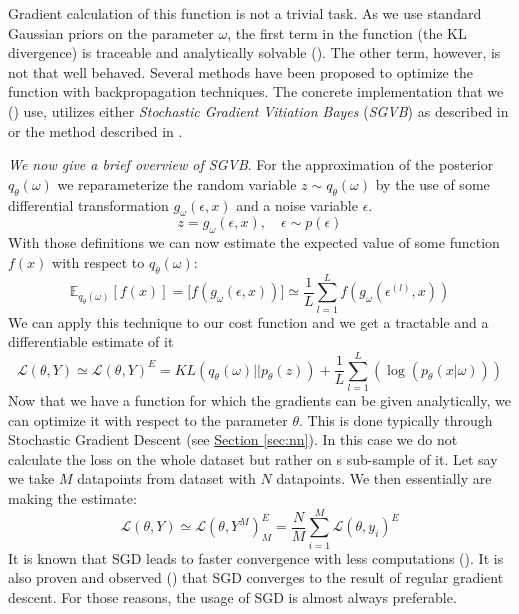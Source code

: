 \documentclass[12pt,a4paper,twoside]{scrartcl}
\numberwithin{equation}{section}
\newcommand{\refsec}[1]{\hyperref[#1]{Section \ref*{#1}}}
\begin{document}
Gradient calculation of this function is not a trivial task. As we use standard Gaussian priors on the parameter \(\omega\), the first term in the function (the KL divergence) is traceable and analytically solvable (\cite{paisley2012}). The other term, however, is not that well behaved. Several methods have been proposed to optimize the function with backpropagation techniques. The concrete implementation that we (\cite{edward}) use, utilizes either \emph{Stochastic Gradient Vitiation Bayes} (\emph{SGVB}) as described in \cite{kingma2013} or the method described in \cite{paisley2012}. 

\emph{We now give a brief overview of SGVB}. For the approximation of the posterior \(q_{\theta}(\omega)\) we reparameterize the random variable \(z \sim q_{\theta}(\omega)\) by the use of some differential transformation \(g_{\omega}(\epsilon , x)\) and a noise variable \(\epsilon\).
\begin{equation}
  z =  g_{\omega}(\epsilon , x), \quad \epsilon \sim p(\epsilon)
\end{equation}
With those definitions we can now estimate the expected value of some function \(f(x)\) with respect to \(q_{\theta}(\omega)\):
\begin{equation}
  \mathbb{E}_{q_{\theta}(\omega)}[f(x)] = \mathbb[f(g_{\omega}(\epsilon , x))] \simeq \frac{1}{L}\sum_{l=1}^L f(g_{\omega}(\epsilon^{(l)} , x))
\end{equation}
We can apply this technique to our cost function and we get a tractable and a differentiable estimate of it
\begin{equation}
  \mathcal{L}(\theta, Y) \simeq \mathcal{L}(\theta,Y)^E = KL(q_{\theta}(\omega)||p_{\theta}(z))  + \frac{1}{L}\sum_{l=1}^L(\log(p_{\theta}(x|\omega)))
\end{equation}
Now that we have a function for which the gradients can be given analytically, we can optimize it with respect to the parameter \(\theta\). This is done typically through Stochastic Gradient Descent (see \refsec{sec:nn}). In this case we do not calculate the loss on the whole dataset but rather on s sub-sample of it. Let say we take \(M\) datapoints from dataset with \(N\) datapoints. We then essentially are making the estimate:
\begin{equation}
  \mathcal{L}(\theta, Y) \simeq \mathcal{L}(\theta, Y^M)^E_M = \frac{N}{M}  \sum_{i=1}^{M}\mathcal{L}(\theta, y_i)^E
\end{equation}
It is known that SGD leads to faster convergence with less computations (\cite{robbins1951}). It is also proven and observed (\cite{shapiro1996}) that SGD converges to the result of regular gradient descent. For those reasons, the usage of SGD is almost always preferable.
\end{document}
